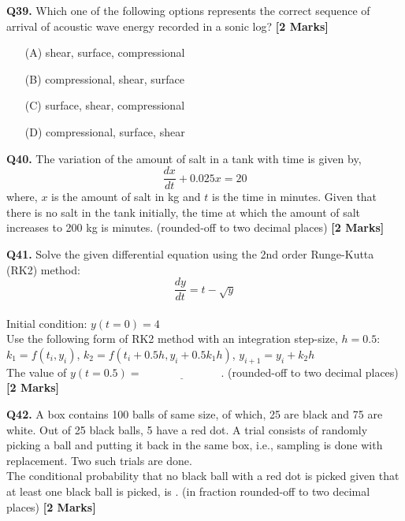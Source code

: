 \documentclass[11pt]{article}
\newcommand{\questionb}[2]{
    \noindent\textbf{Q#2.} #1 \hfill \textbf{[2 Marks]}
}
\begin{document}
\questionb{Which one of the following options represents the correct sequence of arrival of acoustic wave energy recorded in a sonic log?}{39}
\begin{enumerate}
    \item[(A)] shear, surface, compressional  
    \item[(B)] compressional, shear, surface  
    \item[(C)] surface, shear, compressional  
    \item[(D)] compressional, surface, shear  
\end{enumerate}
\vspace{0.5cm}

\questionb{The variation of the amount of salt in a tank with time is given by, \[ \frac{dx}{dt} + 0.025x = 20 \] where, \( x \) is the amount of salt in kg and \( t \) is the time in minutes. Given that there is no salt in the tank initially, the time at which the amount of salt increases to 200 kg is \underline{\hspace{3cm}} minutes. (rounded-off to two decimal places)}{40}
\vspace{0.5cm}

\questionb{Solve the given differential equation using the 2nd order Runge-Kutta (RK2) method: \[ \frac{dy}{dt} = t - \sqrt{y} \] \\
Initial condition: \( y(t=0) = 4 \) \\
Use the following form of RK2 method with an integration step-size, \( h = 0.5 \): \\
\( k_1 = f(t_i, y_i) \), \( k_2 = f(t_i + 0.5h, y_i + 0.5k_1 h) \), \( y_{i+1} = y_i + k_2 h \) \\
The value of \( y(t = 0.5) = \underline{\hspace{3cm}} \). (rounded-off to two decimal places)}{41}
\vspace{0.5cm}

\questionb{A box contains 100 balls of same size, of which, 25 are black and 75 are white. Out of 25 black balls, 5 have a red dot. A trial consists of randomly picking a ball and putting it back in the same box, i.e., sampling is done with replacement. Two such trials are done. \\
The conditional probability that no black ball with a red dot is picked given that at least one black ball is picked, is \underline{\hspace{3cm}}. (in fraction rounded-off to two decimal places)}{42}
\vspace{0.5cm}
\end{document}
